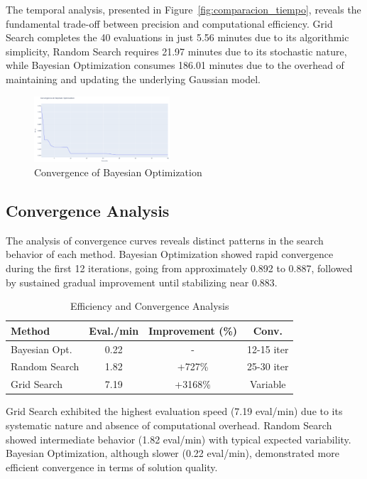 \documentclass[conference]{IEEEtran}
\begin{document}
The temporal analysis, presented in Figure~\ref{fig:comparacion_tiempo}, reveals the fundamental trade-off between precision and computational efficiency. Grid Search completes the 40 evaluations in just 5.56 minutes due to its algorithmic simplicity, Random Search requires 21.97 minutes due to its stochastic nature, while Bayesian Optimization consumes 186.01 minutes due to the overhead of maintaining and updating the underlying Gaussian model.

\begin{figure}[htbp]
  \centering
  \includegraphics[width=0.45\textwidth]{fig_convergencia_bo.png}
  \caption{Convergence of Bayesian Optimization}
  \label{fig:convergencia}
\end{figure}

\subsection{Convergence Analysis}

The analysis of convergence curves reveals distinct patterns in the search behavior of each method. Bayesian Optimization showed rapid convergence during the first 12 iterations, going from approximately 0.892 to 0.887, followed by sustained gradual improvement until stabilizing near 0.883.

\begin{table}[htbp]
\caption{Efficiency and Convergence Analysis}
\begin{center}
\small
\begin{tabular}{lccc}
\hline
\textbf{Method} & \textbf{Eval./min} & \textbf{Improvement (\%)} & \textbf{Conv.} \\
\hline
Bayesian Opt. & 0.22 & - & 12-15 iter \\
Random Search & 1.82 & +727\% & 25-30 iter \\
Grid Search & 7.19 & +3168\% & Variable \\
\hline
\end{tabular}
\label{tab:eficiencia}
\end{center}
\end{table}

Grid Search exhibited the highest evaluation speed (7.19 eval/min) due to its systematic nature and absence of computational overhead. Random Search showed intermediate behavior (1.82 eval/min) with typical expected variability. Bayesian Optimization, although slower (0.22 eval/min), demonstrated more efficient convergence in terms of solution quality.
\end{document}
